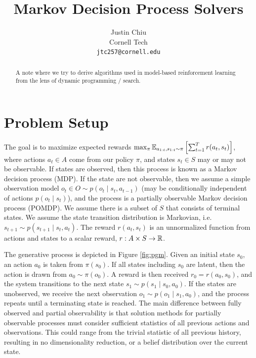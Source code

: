 \documentclass[11pt]{article}
\title{Markov Decision Process Solvers}
\author{Justin Chiu \\
  Cornell Tech \\
  \texttt{jtc257@cornell.edu}}
\begin{document}
\maketitle
\begin{abstract}
A note where we try to derive algorithms used in model-based reinforcement learning
from the lens of dynamic programming / search.
\end{abstract}

\section{Problem Setup}
The goal is to maximize expected rewards $\max_\pi \mathbb{E}_{a_{1:t},s_{1:t}\sim\pi}\left[\sum_{t=1}^T r(a_t, s_t)\right]$,
where actions $a_t\in A$ come from our policy $\pi$,
and states $s_t\in S$ may or may not be observable.
If states are observed, then this process is known as a Markov decision process (MDP).
If the state are not observable,
then we assume a simple observation model $o_t\in O \sim p(o_t \mid s_t, a_{t-1})$
(may be conditionally independent of actions $p(o_t \mid s_t)$),
and the process is a partially observable Markov decision process (POMDP).
We assume there is a subset of $S$ that consists of terminal states.
We assume the state transition distribution is Markovian, i.e. $s_{t+1} \sim p(s_{t+1} \mid s_t, a_t)$.
The reward $r(a_t, s_t)$ is an unnormalized function from actions and states to a scalar
reward, $r: A\times S \to \mathbb{R}$.

The generative process is depicted in Figure \ref{fig:pgm}.
Given an initial state $s_0$, an action $a_0$ is taken from $\pi(s_0)$.
If all states including $s_0$ are latent, then the action is drawn from $a_0\sim \pi(o_0)$.
A reward is then received $r_0 = r(a_0, s_0)$,
and the system transitions to the next state $s_1 \sim p(s_1\mid s_0, a_0)$.
If the states are unobserved, we receive the next observation $o_1\sim p(o_1\mid s_1, a_0)$,
and the process repeats until a terminating state is reached.
The main difference between fully observed and partial observability is that
solution methods for partially observable processes must consider
sufficient statistics of all previous actions and observations.
This could range from the trivial statistic of all previous history,
resulting in no dimensionality reduction,
or a belief distribution over the current state.
\end{document}

